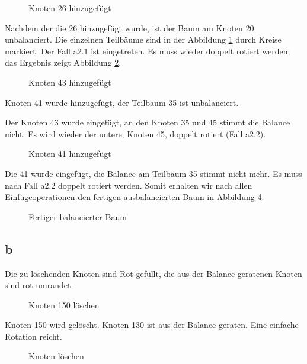 \documentclass[12pt]{article}
\begin{document}
\begin{figure}[h]
	\centering
	\scalebox{.5}{}
	\caption{Knoten 26 hinzugefügt}
	\label{fig:abb2f}
\end{figure}

Nachdem der die 26 hinzugefügt wurde, ist der Baum am Knoten 20 unbalanciert. Die einzelnen
Teilbäume sind in der Abbildung \ref{fig:abb2f} durch Kreise markiert. Der Fall a2.1 ist 
eingetreten. Es muss wieder doppelt rotiert werden; das Ergebnis zeigt Abbildung \ref{fig:abb3b}.

\begin{figure}[h]
	\centering
	\scalebox{.5}{}
	\caption{Knoten 43 hinzugefügt}
	\label{fig:abb3b}
\end{figure}

Knoten 41 wurde hinzugefügt, der Teilbaum 35 ist unbalanciert. 
\newpage

Der Knoten 43 wurde eingefügt, an den Knoten 35 und 45 stimmt die Balance nicht. Es wird wieder
der untere, Knoten 45, doppelt rotiert (Fall a2.2).

\begin{figure}[h]
	\centering
	\scalebox{.5}{}
	\caption{Knoten 41 hinzugefügt}
	\label{fig:abb4b}
\end{figure}

Die 41 wurde eingefügt, die Balance am Teilbaum 35 stimmt nicht mehr. Es muss nach Fall a2.2 doppelt
rotiert werden. Somit erhalten wir nach allen Einfügeoperationen den fertigen ausbalancierten
Baum in Abbildung \ref{fig:abb5b}.
\begin{figure}[h]
	\centering
	\scalebox{.5}{}
	\caption{Fertiger balancierter Baum}
	\label{fig:abb5b}
\end{figure}


\newpage

\subsection*{b}
Die zu löschenden Knoten sind Rot gefüllt, die aus der Balance geratenen Knoten sind
rot umrandet.

\begin{figure}[h]
	\centering
	\scalebox{.5}{}
	\caption{Knoten 150 löschen}
	\label{fig:abb6b}
\end{figure}
Knoten 150 wird gelöscht. Knoten 130 ist aus der Balance geraten. Eine einfache Rotation reicht.

\begin{figure}[h]
	\centering
	\scalebox{.5}{}
	\caption{Knoten  löschen}
	\label{fig:abb7b}
\end{figure}
\end{document}
